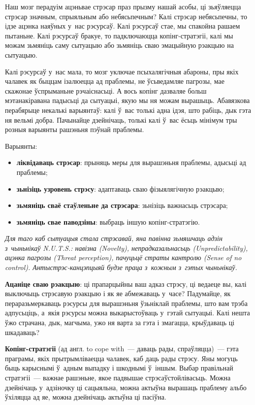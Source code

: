 Наш мозг перадуім ацэньвае стрэсар праз прызму нашай асобы, ці зьяўляецца стрэсар значным, спрыяльным або небясьпечным? Калі стрэсар небясьпечны, то ідзе ацэнка наяўных у~нас рэсурсаў. Калі рэсурсаў стае, мы спакойна рашаем пытаньне. Калі рэсурсаў бракуе, то падключаюцца копінг-стратэгіі, калі мы можам зьмяніць саму сытуацыю або зьмяніць сваю эмацыйную рэакцыю на сытуацыю.

Калі рэсурсаў у~нас мала, то мозг уключае псыхалягічныя абароны, пры якіх чалавек як быццам ізалюецца ад праблемы, не ўсьведамляе пагрозы, мае скажонае ўспрыманьне рэчаіснасьці. А вось копінг дазваляе больш мэтанакіравана падысьці да сытуацыі, якую мы ня можам вырашыць. Абавязкова перабярыце некалькі варыянтаў: калі ў~вас толькі адна ідэя, што рабіць, дык гэта ня вельмі добра. Пачынайце дзейнічаць, толькі калі ў~вас ёсьць мінімум тры розныя варыянты рашэньня пэўнай праблемы.

Варыянты: 
\begin{itemize}
  \item \textbf{ліквідаваць стрэсар}: прыняць меры для вырашэньня праблемы, адысьці ад праблемы;
  \item \textbf{зьнізіць узровень стрэсу}: адаптаваць сваю фізыялягічную рэакцыю;
  \item \textbf{зьмяніць сваё стаўленьне да стрэсара}: зьнізіць важнасьць стрэсара;
  \item \textbf{зьмяніць свае паводзіны}: выбраць іншую копінг-стратэгію.
\end{itemize}

\emph{Для таго каб сытуацыя стала стрэсавай, яна павінна зьмяшчаць адзін з~чыньнікаў N.U.T.S.: навізна (Novelty), непрадказальнасьць (Unpredictability), ацэнка пагрозы (Threat per\-cep\-tion), пачуцьцё страты кантролю (Sense of no control). Антыстрэс-канцэпцыяй будзе праца з~кожным з~гэтых чыньнікаў.}

\textbf{Ацаніце сваю рэакцыю}: ці прапарцыйны ваш адказ стрэсу, ці ведаеце вы, калі выключыць стрэсавую рэакцыю і як яе абмежаваць у~часе? Падумайце, як пераразьмеркаваць рэсурсы для вырашэньня ўзьніклай праблемы, што вам трэба адпусьціць, а~якія рэсурсы можна выкарыстоўваць у~гэтай сытуацыі. Калі нешта ўжо страчана, дык, магчыма, ужо ня варта за гэта і змагацца, крыўдаваць ці шкадаваць?

\textbf{Копінг-стратэгіі} (ад англ. to cope with~--- даваць рады, спраўляцца)~--- гэта праграмы, якіх прытрымліваецца чалавек, каб даць рады стрэсу. Яны могуць быць карыснымі ў~адным выпадку і шкоднымі ў~іншым. Выбар правільнай стратэгіі~--- важнае рашэньне, якое падвышае стрэсаўстойлівасьць. Можна дзейнічаць у~адзіночку ці сацыяльна, можна актыўна вырашаць праблему альбо ўхіляцца ад яе, можна дзейнічаць актыўна ці пасіўна.

